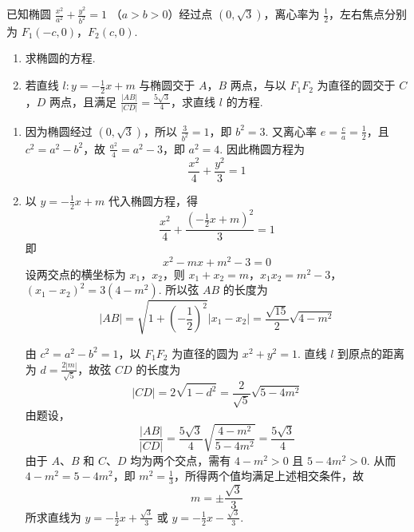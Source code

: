 \begin{problem}
已知椭圆 \(\frac{x^2}{a^2} + \frac{y^2}{b^2} = 1 \) （\(a > b > 0\)）经过点 \((0, \sqrt{3})\)，离心率为 \(\frac{1}{2}\)，左右焦点分别为 \(F_1(-c, 0)\)，\(F_2(c, 0)\).

\begin{enumerate}
\item 求椭圆的方程.
\item 若直线 \(l: y = -\frac{1}{2} x + m\) 与椭圆交于 \(A\)，\(B\) 两点，与以 \(F_{1}F_{2}\) 为直径的圆交于 \(C\)，\(D\) 两点，且满足 \(\frac{|AB|}{|CD|} = \frac{5\sqrt{3}}{4}\)，求直线 \(l\) 的方程.
\end{enumerate}

\begin{solution}
\begin{enumerate}
\item 因为椭圆经过 \((0,\sqrt3)\)，所以 \(\frac{3}{b^2}=1\)，即 \(b^2=3\). 又离心率 \(e=\frac ca=\frac12\)，且 \(c^2=a^2-b^2\)，故 \(\frac{a^2}{4}=a^2-3\)，即 \(a^2=4\).
因此椭圆方程为
\[
\frac{x^2}{4}+\frac{y^2}{3}=1
\]

\item 以 \(y=-\frac12x+m\) 代入椭圆方程，得
\[
\frac{x^2}{4}+\frac{\left(-\frac12x+m\right)^2}{3}=1
\]
即
\[
x^2-mx+m^2-3=0
\]
设两交点的横坐标为 \(x_1\)，\(x_2\)，则
\(x_1+x_2=m\)，\(x_1x_2=m^2-3\)，\((x_1-x_2)^2=3(4-m^2)\).
所以弦 \(AB\) 的长度为
\[
|AB|=\sqrt{1+\left(-\frac12\right)^2}|x_1-x_2|=\frac{\sqrt{15}}2\sqrt{4-m^2}
\]

由 \(c^2=a^2-b^2=1\)，以 \(F_1F_2\) 为直径的圆为 \(x^2+y^2=1\). 直线 \(l\) 到原点的距离为 \(d=\frac{2|m|}{\sqrt5}\)，故弦 \(CD\) 的长度为
\[
|CD|=2\sqrt{1-d^2}=\frac2{\sqrt5}\sqrt{5-4m^2}
\]
由题设，
\[
\frac{|AB|}{|CD|}=\frac{5\sqrt3}{4}\sqrt{\frac{4-m^2}{5-4m^2}}=\frac{5\sqrt3}{4}
\]
由于 \(A\)、\(B\) 和 \(C\)、\(D\) 均为两个交点，需有 \(4-m^2>0\) 且 \(5-4m^2>0\). 从而 \(4-m^2=5-4m^2\)，即 \(m^2=\frac13\)，所得两个值均满足上述相交条件，故
\[
m=\pm\frac{\sqrt3}{3}
\]
所求直线为 \(y=-\frac12x+\frac{\sqrt3}{3}\) 或 \(y=-\frac12x-\frac{\sqrt3}{3}\).
\end{enumerate}
\end{solution}
\end{problem}

